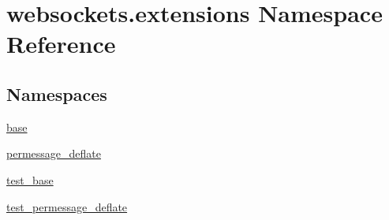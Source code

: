 \hypertarget{namespacewebsockets_1_1extensions}{}\section{websockets.\+extensions Namespace Reference}
\label{namespacewebsockets_1_1extensions}
\subsection*{Namespaces}
\begin{DoxyCompactItemize}
\item 
 \hyperlink{namespacewebsockets_1_1extensions_1_1base}{base}
\item 
 \hyperlink{namespacewebsockets_1_1extensions_1_1permessage__deflate}{permessage\+\_\+deflate}
\item 
 \hyperlink{namespacewebsockets_1_1extensions_1_1test__base}{test\+\_\+base}
\item 
 \hyperlink{namespacewebsockets_1_1extensions_1_1test__permessage__deflate}{test\+\_\+permessage\+\_\+deflate}
\end{DoxyCompactItemize}
